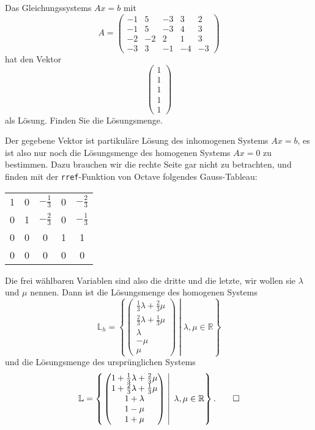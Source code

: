 Das Gleichungssystems $Ax=b$ mit
\[
A=\begin{pmatrix}
-1& 5&-3& 3& 2\\
-1& 5&-3& 4& 3\\
-2&-2& 2& 1& 3\\
-3& 3&-1&-4&-3
\end{pmatrix}
\]
hat den Vektor
\[
\begin{pmatrix}1\\1\\1\\1\\1\end{pmatrix}
\]
als Lösung.
Finden Sie die Lösungsmenge.


\begin{loesung}
Der gegebene Vektor ist partikuläre Lösung des inhomogenen Systems
$Ax=b$, es ist also nur noch die Lösungsmenge des homogenen Systems
$Ax=0$ zu bestimmen.
Dazu brauchen wir die rechte Seite gar nicht zu betrachten,
und finden mit der {\tt rref}-Funktion von Octave folgendes Gauss-Tableau:
\begin{center}
\begin{tabular}{|ccccc|}
\hline
1&0&$-\frac13$&0&$-\frac23$\\
0&1&$-\frac23$&0&$-\frac13$\\
0&0&         0&1&1\\
0&0&         0&0&0\\
\hline
\end{tabular}
\end{center}
Die frei wählbaren Variablen sind also die dritte und die letzte,
wir wollen sie $\lambda$ und $\mu$ nennen. Dann ist die Lösungsmenge
des homogenen Systems
\[
{\mathbb L}_h
=
\left\{
\left.
\begin{pmatrix}
\frac13\lambda+\frac23\mu\\
\frac23\lambda+\frac13\mu\\
\lambda\\
-\mu\\
\mu
\end{pmatrix}
\;
\right|
\;
\lambda,\mu\in\mathbb R
\right\}
\]
und die Lösungsmenge des ursprünglichen Systems
\[
{\mathbb L}
=
\left\{
\left.
\begin{pmatrix}
1+\frac13\lambda+\frac23\mu\\
1+\frac23\lambda+\frac13\mu\\
1+\lambda\\
1-\mu\\
1+\mu
\end{pmatrix}
\;
\right|
\;
\lambda,\mu\in\mathbb R
\right\}.
\qedhere
\]
\end{loesung}
